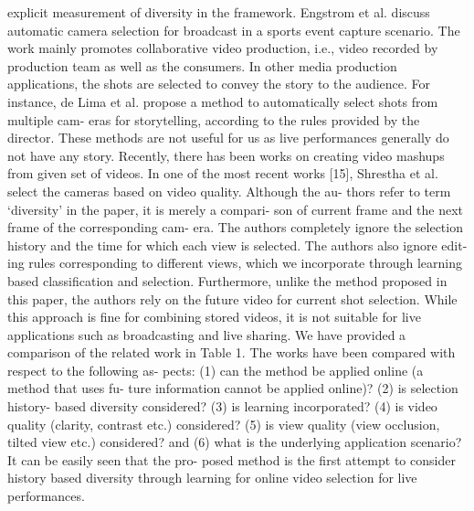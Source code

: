 \documentclass{sig-alternate}
\begin{document}
explicit measurement of diversity in the framework. Engstrom et
al. \cite{salas:eight} discuss automatic camera selection for broadcast in a sports
event capture scenario. The work mainly promotes collaborative
video production, i.e., video recorded by production team as well
as the consumers.
In other media production applications, the shots are selected to
convey the story to the audience. For instance, de Lima et al. \cite{salas:seven}
propose a method to automatically select shots from multiple cam-
eras for storytelling, according to the rules provided by the director.
These methods are not useful for us as live performances generally
do not have any story.
Recently, there has been works on creating video mashups from
given set of videos. In one of the most recent works [15], Shrestha
et al. select the cameras based on video quality. Although the au-
thors refer to term ‘diversity’ in the paper, it is merely a compari-
son of current frame and the next frame of the corresponding cam-
era. The authors completely ignore the selection history and the
time for which each view is selected. The authors also ignore edit-
ing rules corresponding to different views, which we incorporate
through learning based classification and selection. Furthermore,
unlike the method proposed in this paper, the authors rely on the
future video for current shot selection. While this approach is fine
for combining stored videos, it is not suitable for live applications
such as broadcasting and live sharing.
We have provided a comparison of the related work in Table 1.
The works have been compared with respect to the following as-
pects: (1) can the method be applied online (a method that uses fu-
ture information cannot be applied online)? (2) is selection history-
based diversity considered? (3) is learning incorporated? (4) is
video quality (clarity, contrast etc.) considered? (5) is view quality
(view occlusion, tilted view etc.) considered? and (6) what is the
underlying application scenario? It can be easily seen that the pro-
posed method is the first attempt to consider history based diversity
through learning for online video selection for live performances.
\end{document}
